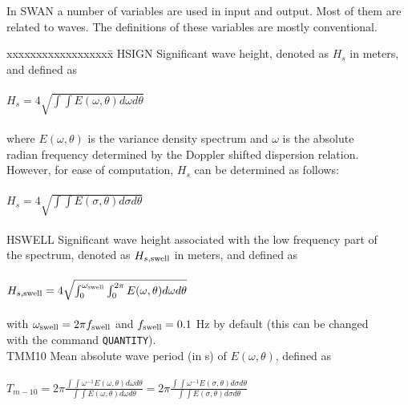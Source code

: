 \documentclass[12pt]{book}
\begin{document}
\appendix

 \label{app:defvar}

In SWAN a number of variables are used in input and output. Most of them are related to waves. The definitions of these variables
are mostly conventional.
\begin{tabbing}
xxxxxxxxxxxxxxxxxx\= \kill
HSIGN                \> Significant wave height, denoted as $H_s$ in meters, and defined as\+\\
                        \\
                        $H_s = 4 \sqrt{\int \int E(\omega, \theta) d\omega d\theta}$ \\
                        \\
                        where $E(\omega,\theta)$ is the variance density spectrum and $\omega$ is the absolute\\
                        radian frequency determined by the Doppler shifted dispersion relation.\\
                        However, for ease of computation, $H_s$ can be determined as follows:\\
                        \\
                        $H_s = 4 \sqrt{\int \int E(\sigma, \theta) d\sigma d\theta}$ \\
                        \-\\
HSWELL               \> Significant wave height associated with the low frequency part of\+\\
                        the spectrum, denoted as $H_{s,{\rm swell}}$ in meters, and defined as\\
                        \\
                        $H_{s,{\rm swell}} = 4 \sqrt{\int_{0}^{\omega_{\rm swell}} \int_{0}^{2\pi} E(\omega, \theta) d\omega d\theta}$ \\
                        \\
                        with $\omega_{\rm swell}=2\pi f_{\rm swell}$ and $f_{\rm swell}=0.1$ Hz by default (this can be changed\\
                        with the command {\tt QUANTITY}). \-\\
TMM10                \> Mean absolute wave period (in s) of $E(\omega,\theta)$, defined as\+\\
                        \\
$T_{m-10} = 2\pi \frac{\int \int \omega^{-1} E(\omega, \theta) d\omega d\theta}{\int \int E(\omega, \theta) d\omega d\theta} = 2\pi \frac{\int \int \omega^{-1} E(\sigma, \theta) d\sigma d\theta}{\int \int E(\sigma, \theta) d\sigma d\theta}$ \\

\end{tabbing}
\end{document}

